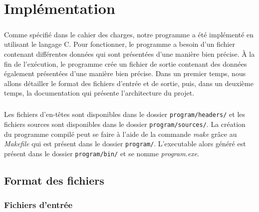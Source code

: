 \chapter{Implémentation}


	\paragraph{}
	Comme spécifié dans le cahier des charges, notre programme a été implémenté en utilisant le langage C. Pour fonctionner, le programme a besoin d'un fichier contenant différentes données qui sont présentées d'une manière bien précise. À la fin de l'exécution, le programme crée un fichier de sortie contenant des données également présentées d'une manière bien précise. Dans un premier temps, nous allons détailler le format des fichiers d'entrée et de sortie, puis, dans un deuxième temps, la documentation qui présente l'architecture du projet.
	
	\paragraph{}
	Les fichiers d'en-têtes sont disponibles dans le dossier \texttt{program/headers/} et les fichiers sources sont disponibles dans le dossier \texttt{program/sources/}. La création du programme compilé peut se faire à l'aide de la commande \textit{make} grâce au \textit{Makefile} qui est présent dans le dossier \texttt{program/}. L'executable alors généré est présent dans le dossier \texttt{program/bin/} et se nomme \textit{program.exe}.
%

	\section{Format des fichiers}
		\subsection{Fichiers d'entrée}
	
